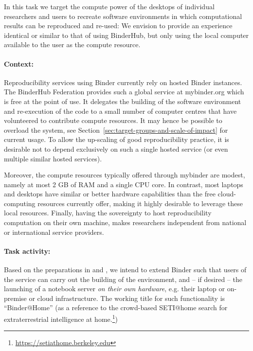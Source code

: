 \begin{task}[
  title=Binder@Home,
  id=binder-at-home,
  lead=SRL,
  PM=7,
  partners={MP,UIO,IFR}
]
In this task we target the compute power of the desktops of individual researchers and
users to recreate software environments in which computational results can be
reproduced and re-used: We envision to provide an experience identical or similar
to that of using BinderHub, but only using the local computer available to the
user as the compute resource.

\paragraph*{Context:} Reproducibility services using Binder currently rely on hosted Binder instances.
The BinderHub Federation provides such a global service at mybinder.org
which is free at
the point of use. It delegates the building of the software environment and
re-execution of the code to a small number of computer centres that have
volunteered to contribute compute resources.
It may hence be possible to overload the system, see
Section~\ref{sec:target-groups-and-scale-of-impact} for current usage.
To allow the up-scaling of good reproducibility practice, it is 
desirable not to depend exclusively on such a single hosted service (or even multiple similar hosted services).

Moreover, the compute resources typically offered through mybinder are modest, namely at most 2 GB of RAM
and a single CPU core.
In contrast, most laptops and desktops have similar or better hardware capabilities than
the free \mybinder{} cloud-computing resources currently offer, making it highly desirable to leverage these local resources.
Finally, having the sovereignty to host reproducibility computation on their own
machine, makes researchers independent from national or international service providers. 

\paragraph*{Task activity:} Based on the preparations in  and
, we intend to extend Binder such that users of the service can
carry out the building of the environment, and -- if desired -- the launching of a
notebook server \emph{on their own hardware}, e.g. their laptop or on-premise or cloud infrastructure.
The working title for such
functionality is ``Binder@Home'' (as a reference to the crowd-based SETI@home search for
extraterrestrial intelligence at home.\footnote{\url{https://setiathome.berkeley.edu}})


\end{task}
